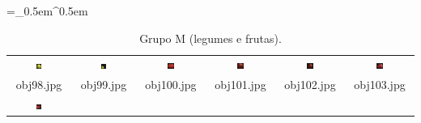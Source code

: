 \begin{table}[H]
  \centering
  \caption{Grupo M (legumes e frutas).}
  \tabulinesep =_0.5em^0.5em
  \everyrow{\tabucline[0.4pt]-}
  \begin{tabu}{|cccccc|}
    \includegraphics[width=0.1\textwidth,height=0.1\textwidth]{imagens/coil_100/legumes_frutas/obj2__0.png} &
    \includegraphics[width=0.1\textwidth,height=0.1\textwidth]{imagens/coil_100/legumes_frutas/obj2__0_1.png} &
    \includegraphics[width=0.1\textwidth,height=0.1\textwidth]{imagens/coil_100/legumes_frutas/obj4__0.png} &
    \includegraphics[width=0.1\textwidth,height=0.1\textwidth]{imagens/coil_100/legumes_frutas/obj63__0.png} &
    \includegraphics[width=0.1\textwidth,height=0.1\textwidth]{imagens/coil_100/legumes_frutas/obj63__0_1.png} &
    \includegraphics[width=0.1\textwidth,height=0.1\textwidth]{imagens/coil_100/legumes_frutas/obj75__0.png}
    \\
    \scriptsize{obj98.jpg} & \scriptsize{obj99.jpg} & \scriptsize{obj100.jpg} &
    \scriptsize{obj101.jpg} & \scriptsize{obj102.jpg} & \scriptsize{obj103.jpg}
    \\
    \includegraphics[width=0.1\textwidth,height=0.1\textwidth]{imagens/coil_100/legumes_frutas/obj75__0_1.png} &

\end{tabu}
\end{table}
